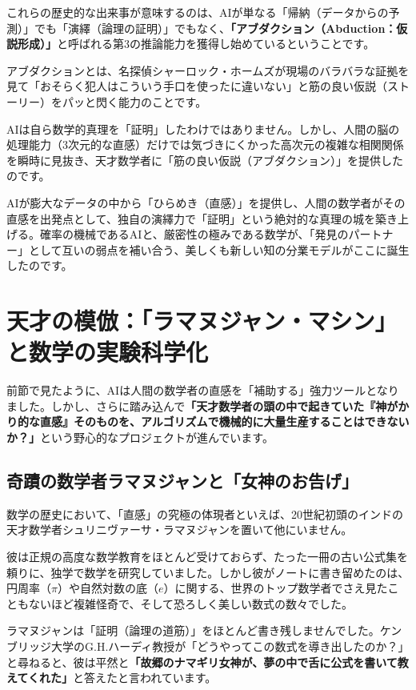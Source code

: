 これらの歴史的な出来事が意味するのは、AIが単なる「帰納（データからの予測）」でも「演繹（論理の証明）」でもなく、\textbf{「アブダクション（Abduction：仮説形成）」}と呼ばれる第3の推論能力を獲得し始めているということです。

アブダクションとは、名探偵シャーロック・ホームズが現場のバラバラな証拠を見て「おそらく犯人はこういう手口を使ったに違いない」と筋の良い仮説（ストーリー）をパッと閃く能力のことです。

AIは自ら数学的真理を「証明」したわけではありません。しかし、人間の脳の処理能力（3次元的な直感）だけでは気づきにくかった高次元の複雑な相関関係を瞬時に見抜き、天才数学者に「筋の良い仮説（アブダクション）」を提供したのです。

AIが膨大なデータの中から「ひらめき（直感）」を提供し、人間の数学者がその直感を出発点として、独自の演繹力で「証明」という絶対的な真理の城を築き上げる。確率の機械であるAIと、厳密性の極みである数学が、「発見のパートナー」として互いの弱点を補い合う、美しくも新しい知の分業モデルがここに誕生したのです。

\section{天才の模倣：「ラマヌジャン・マシン」と数学の実験科学化}

前節で見たように、AIは人間の数学者の直感を「補助する」強力ツールとなりました。しかし、さらに踏み込んで\textbf{「天才数学者の頭の中で起きていた『神がかり的な直感』そのものを、アルゴリズムで機械的に大量生産することはできないか？」}という野心的なプロジェクトが進んでいます。

\subsection{奇蹟の数学者ラマヌジャンと「女神のお告げ」}

数学の歴史において、「直感」の究極の体現者といえば、20世紀初頭のインドの天才数学者シュリニヴァーサ・ラマヌジャンを置いて他にいません。

彼は正規の高度な数学教育をほとんど受けておらず、たった一冊の古い公式集を頼りに、独学で数学を研究していました。しかし彼がノートに書き留めたのは、円周率（\(\pi\)）や自然対数の底（\(e\)）に関する、世界のトップ数学者でさえ見たこともないほど複雑怪奇で、そして恐ろしく美しい数式の数々でした。

ラマヌジャンは「証明（論理の道筋）」をほとんど書き残しませんでした。ケンブリッジ大学のG.H.ハーディ教授が「どうやってこの数式を導き出したのか？」と尋ねると、彼は平然と\textbf{「故郷のナマギリ女神が、夢の中で舌に公式を書いて教えてくれた」}と答えたと言われています。

